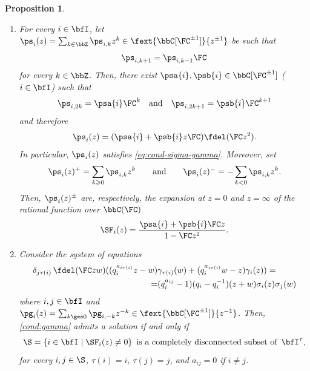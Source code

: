 \documentclass[reqno]{amsart}
\numberwithin{equation}{section}
\newtheorem*{proposition}{Proposition}
\begin{document}
\begin{proposition}\label{prop:sigma-gamma}
\hfill
\begin{enumerate}[leftmargin=2em]\itemsep0.25cm
\item 	
For every $i\in\bfI$, let $\ps_{i}(z)=\sum_{k\in\bbZ}\ps_{i,k}z^k\in\fext{\bbC[\FC^{\pm1}]}{z^{\pm1}}$
be such that
\begin{align}\label{cond:sigma}
	\ps_{i,k+1}=\ps_{i,k-1}\FC
\end{align}
for every $k\in\bbZ$. Then, there exist $\psa{i}, \psb{i}\in\bbC[\FC^{\pm1}]$ ($i\in\bfI$) such that
\begin{equation}
\ps_{i,2k}=\psa{i}\FC^k\quad\mbox{and}\quad\ps_{i,2k+1}=\psb{i}\FC^{k+1}
\end{equation}
and therefore
\begin{equation}\label{eq:sigma-delta}
\ps_{i}(z)=(\psa{i}+\psb{i}z\FC)\fdel(\FC z^2).
\end{equation}
In particular, $\ps_i(z)$ satisfies 
\eqref{eq:cond-sigma-gamma}. Moreover, set
\begin{equation}\label{eq:Sigma-expansions}
	\ps_i(z)^+=\sum_{k\geqslant 0}\ps_{i,k}z^k
	\qquad\text{and}\qquad
	\ps_i(z)^-=-\sum_{k<0}\ps_{i,k}z^k.
\end{equation} 
Then, $\ps_i(z)^{\pm}$ are, respectively, the expansion at $z=0$ and $z=\infty$ of the
rational function over $\bbC(\FC)$
\begin{equation}\label{eq:SF}
	\SF_i(z)=\frac{\psa{i}+\psb{i}\FC z}{1-\FC z^2}.
\end{equation}
\item 
Consider the system of equations
\begin{equation}\label{cond:gamma}
	\begin{aligned}
		\delta_{j\tau(i)}\,\fdel(\FC zw)
		((q_i^{a_{i\tau(i)}}z-w)&\gamma_{\tau(i)}(w)
		+(q_i^{a_{i\tau(i)}}w-z)\gamma_i(z))=\\
		=&(q_i^{a_{ij}}-1)(q_i-q_i^{-1})(z+w)\sigma_i(z)\sigma_j(w)
	\end{aligned}
\end{equation}
where $i,j\in\bfI$ and $\pg_{i}(z)=\sum_{k\ges0}\pg_{i,-k}z^{-k}\in\fext{\bbC[\FC^{\pm1}]}{z^{-1}}$.
Then, \eqref{cond:gamma} admits a solution if and only if 
\begin{equation}\label{cond:sigma-vanishing}
	\S=\{i\in\bfI\mid\SF_i(z)\neq0\}
	\,\mbox{ is a completely disconnected subset of }\,
	\bfI^\tau,
\end{equation}
\ie for every $i,j\in\S$, $\tau(i)=i$, $\tau(j)=j$, and $a_{ij}=0$ if $i\neq j$. 


\end{enumerate}
\end{proposition}
\end{document}
